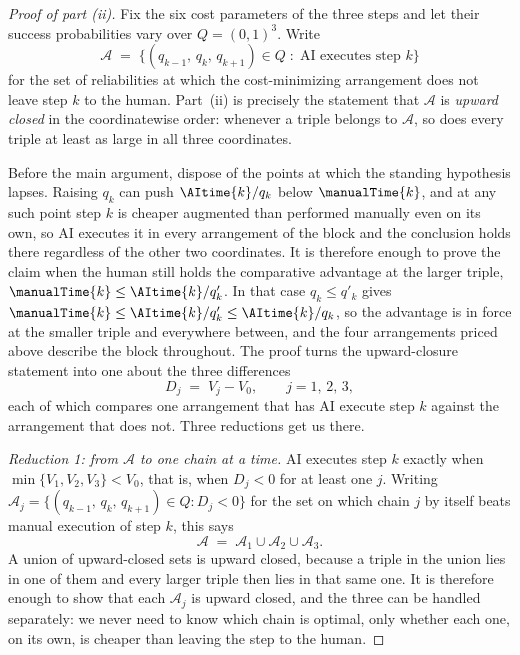 \begin{proof}[Proof of part (ii)]
Fix the six cost parameters of the three steps and let their success probabilities vary over $Q = (0,1)^3$.
Write
\[ \mathcal{A} \;=\; \bigl\{ (q_{k-1},\, q_k,\, q_{k+1}) \in Q \; : \; \text{AI executes step } k \bigr\} \]
for the set of reliabilities at which the cost-minimizing arrangement does not leave step $k$ to the human.
Part~(ii) is precisely the statement that $\mathcal{A}$ is \emph{upward closed} in the coordinatewise order: whenever a triple belongs to $\mathcal{A}$, so does every triple at least as large in all three coordinates.

Before the main argument, dispose of the points at which the standing hypothesis lapses.
Raising $q_k$ can push $\AItime{k}/q_k$ below $\manualTime{k}$, and at any such point step $k$ is cheaper augmented than performed manually even on its own, so AI executes it in every arrangement of the block and the conclusion holds there regardless of the other two coordinates.
It is therefore enough to prove the claim when the human still holds the comparative advantage at the larger triple, $\manualTime{k} \leq \AItime{k}/q'_k$.
In that case $q_k \leq q'_k$ gives $\manualTime{k} \leq \AItime{k}/q'_k \leq \AItime{k}/q_k$, so the advantage is in force at the smaller triple and everywhere between, and the four arrangements priced above describe the block throughout.
The proof turns the upward-closure statement into one about the three differences
\[ D_j \;=\; V_j - V_0, \qquad j = 1,\, 2,\, 3, \]
each of which compares one arrangement that has AI execute step $k$ against the arrangement that does not.
Three reductions get us there.

\begin{sloppypar}
\emph{Reduction 1: from $\mathcal{A}$ to one chain at a time.}
AI executes step $k$ exactly when $\min\{V_1, V_2, V_3\} < V_0$, that is, when $D_j < 0$ for at least one $j$.
Writing $\mathcal{A}_j = \{(q_{k-1},\, q_k,\, q_{k+1}) \in Q : D_j < 0\}$ for the set on which chain $j$ by itself beats manual execution of step $k$, this says
\[ \mathcal{A} \;=\; \mathcal{A}_1 \cup \mathcal{A}_2 \cup \mathcal{A}_3 . \]
A union of upward-closed sets is upward closed, because a triple in the union lies in one of them and every larger triple then lies in that same one.
It is therefore enough to show that each $\mathcal{A}_j$ is upward closed, and the three can be handled separately: we never need to know which chain is optimal, only whether each one, on its own, is cheaper than leaving the step to the human.
\end{sloppypar}


\end{proof}
